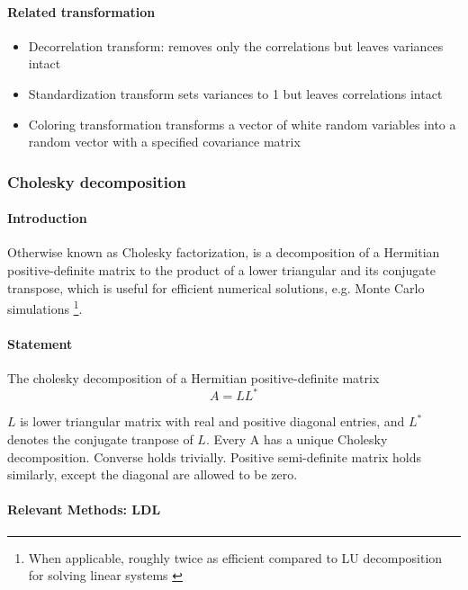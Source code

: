 \paragraph{Related transformation}

\begin{itemize}[itemsep=0pt]
    \item Decorrelation transform: removes only the correlations but leaves variances intact
    \item Standardization transform sets variances to 1 but leaves correlations intact
    \item Coloring transformation transforms a vector of white random variables into a random vector with a specified covariance matrix
\end{itemize}

\subsubsection{Cholesky decomposition} \label{sec:cho-decomp}

\paragraph{Introduction} Otherwise known as Cholesky factorization,
is a decomposition of a Hermitian positive-definite matrix to the product
of a lower triangular and its conjugate transpose, which is useful for
efficient numerical solutions, e.g. Monte Carlo simulations
\footnote{When applicable, roughly twice as efficient compared to LU decomposition for
solving linear systems \cite{numerical_c}}.

\paragraph{Statement} The cholesky decomposition of a Hermitian positive-definite matrix
\begin{equation*}
    A = LL^*
\end{equation*}

$L$ is lower triangular matrix with real and positive diagonal entries, and $L^*$
denotes the conjugate tranpose of $L$. Every A has a unique Cholesky decomposition. Converse
holds trivially. Positive semi-definite matrix holds similarly, except the diagonal are
allowed to be zero. 

\paragraph{Relevant Methods: LDL}

